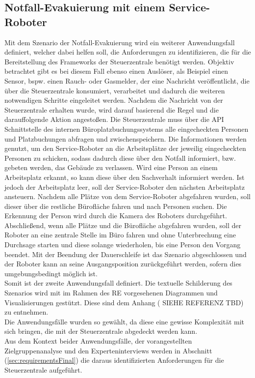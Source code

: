 \subsection{Notfall-Evakuierung mit einem Service-Roboter}
    Mit dem Szenario der Notfall-Evakuierung wird ein weiterer Anwendungsfall definiert, welcher dabei helfen soll, die 
    Anforderungen zu identifizieren, die für die Bereitstellung des Frameworks der Steuerzentrale benötigt werden.
    Objektiv betrachtet gibt es bei diesem Fall ebenso einen Auslöser, als Beispiel einen Sensor, bspw. einen Rauch- 
    oder Gasmelder, der eine Nachricht veröffentlicht, die über die Steuerzentrale konsumiert, verarbeitet und dadurch die 
    weiteren notwendigen Schritte eingeleitet werden. Nachdem die Nachricht von der Steuerzentrale erhalten wurde, wird 
    darauf basierend die Regel und die darauffolgende Aktion angestoßen. Die Steuerzentrale muss über die \acs{API} 
    Schnittstelle des internen Büroplatzbuchungssystems alle eingecheckten Personen und Platzbuchungen abfragen und 
    zwischenspeichern. Die Informationen werden genutzt, um den Service-Roboter an die Arbeitsplätze der jeweilig 
    eingecheckten Personen zu schicken, sodass dadurch diese über den Notfall informiert, bzw. gebeten werden, das 
    Gebäude zu verlassen. Wird eine Person an einem Arbeitsplatz erkannt, so kann diese über den Sachverhalt informiert 
    werden. Ist jedoch der Arbeitsplatz leer, soll der Service-Roboter den nächsten Arbeitsplatz ansteuern. Nachdem alle 
    Plätze von dem Service-Roboter abgefahren wurden, soll dieser über die restliche Bürofläche fahren und nach Personen 
    suchen. Die Erkennung der Person wird durch die Kamera des Roboters durchgeführt. Abschließend, wenn alle Plätze und die 
    Bürofläche abgefahren wurden, soll der Roboter an eine zentrale Stelle im Büro fahren und ohne Unterbrechung eine 
    Durchsage starten und diese solange wiederholen, bis eine Person den Vorgang beendet. Mit der Beendung der Dauerschleife 
    ist das Szenario abgeschlossen und der Roboter kann an seine Ausgangsposition zurückgeführt werden, sofern dies 
    umgebungsbedingt möglich ist.
    \\
    Somit ist der zweite Anwendungsfall definiert. Die textuelle Schilderung des Szenarios wird mit im Rahmen des \acs{RE} 
    vorgesehenen Diagrammen und Visualisierungen gestützt. Diese sind dem Anhang (%
    SIEHE REFERENZ TBD) zu entnehmen.
    \\
    \linebreak
    Die Anwendungsfälle wurden so gewählt, da diese eine gewisse Komplexität mit sich bringen, die mit der Steuerzentrale 
    abgedeckt werden kann.
    \\
    Aus dem Kontext beider Anwendungsfälle, der vorangestellten Zielgruppenanalyse und den Experteninterviews werden in Abschnitt 
    (\ref{sec:requirementsFinal}) die daraus identifizierten Anforderungen für die Steuerzentrale aufgeführt.


